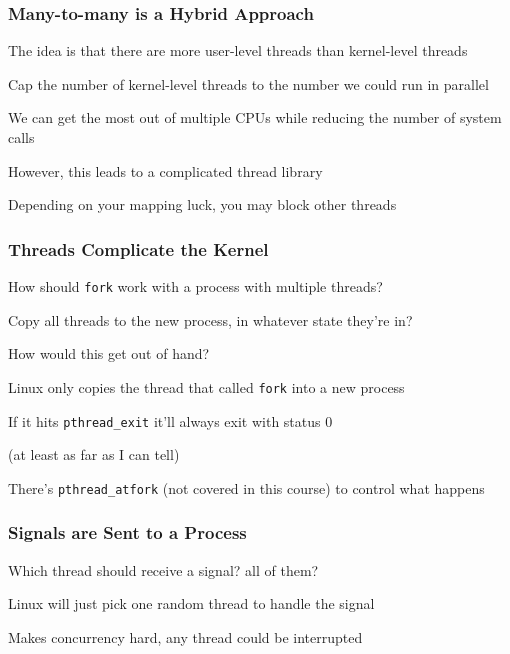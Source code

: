   \begin{frame}
    \frametitle{Many-to-many is a Hybrid Approach}

    The idea is that there are more user-level threads than kernel-level threads

    \hspace{2em} Cap the number of kernel-level threads to the number we could
    run in parallel

    \vspace{2em}

    We can get the most out of multiple CPUs while reducing the number of system
    calls

    \vspace{2em}

    However, this leads to a complicated thread library

    \hspace{2em} Depending on your mapping luck, you may block other threads
  \end{frame}

  \begin{frame}
    \frametitle{Threads Complicate the Kernel}

    How should \texttt{fork} work with a process with multiple threads?

    \hspace{2em} Copy all threads to the new process, in whatever state they're
    in?

    \hspace{4em} How would this get out of hand?

    \vspace{2em}

    Linux only copies the thread that called \texttt{fork} into a new process

    \hspace{2em} If it hits \texttt{pthread\_exit} it'll always exit with status
    0

    \hspace{4em} (at least as far as I can tell)

    \vspace{2em}

    There's \texttt{pthread\_atfork} (not covered in this course) to control
    what happens
  \end{frame}

  \begin{frame}
    \frametitle{Signals are Sent to a Process}

    Which thread should receive a signal? all of them?

    \vspace{2em}

    Linux will just pick one random thread to handle the signal

    \hspace{2em} Makes concurrency hard, any thread could be interrupted
  \end{frame}

